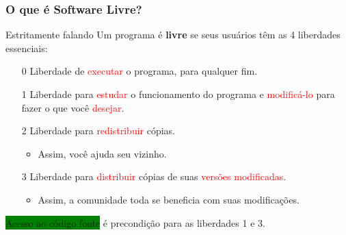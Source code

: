 \documentclass[xcolor=dvipsnames]{beamer}
\newcommand{\tred}[1]{\textcolor{red}{#1}}
\newcommand{\bgreen}[1]{\colorbox{green}{#1}}
\begin{document}
\begin{frame}
	\frametitle{O que é Software Livre?}
	\begin{block}{Estritamente falando}
	      Um programa é {\bf livre} se seus usuários têm as 4 liberdades 
essenciais:%
		  \begin{enumerate}
  		    \item[0] Liberdade de \tred{executar} o programa, para 
qualquer fim.\vspace{0.1cm}%
		    \item[1] Liberdade para \tred{estudar} o funcionamento do 
programa e \tred{modificá-lo} para fazer o que você 
\tred{desejar}.\vspace{0.2cm}%
		    \item[2] Liberdade para \tred{redistribuir} cópias. 
\vspace{0.1cm}
		      \begin{itemize}
		      \item Assim, você ajuda seu vizinho. \vspace{0.1cm}%
		      \end{itemize}
		    \item[3] Liberdade para \tred{distribuir} cópias de suas 
\tred{versões modificadas}.
		      \begin{itemize}
		      \item Assim, a comunidade toda se beneficia com suas 
modificações.
		      \end{itemize}
		  \end{enumerate}
		   \vspace{0.1cm}%
		  \bgreen{Acesso ao código fonte} é precondição para as 
liberdades 1 e 3.

	\end{block}
	
\end{frame}
\end{document}
